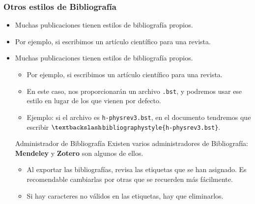 \documentclass[aspectratio=1610]{beamer}%
\begin{document}
\begin{frame}[fragile]
\frametitle{\textbf{Otros estilos de Bibliografía}}
\justifying
 \begin{itemize}\justifying
  \item Muchas publicaciones tienen estilos de bibliografía propios.
  \item Por ejemplo, si escribimos un artículo científico para una revista.
  \item Muchas publicaciones tienen estilos de bibliografía propios.
  \begin{itemize}\justifying
  \item Por ejemplo, si escribimos un artículo científico para una revista.
  \item En este caso, nos proporcionarán un archivo \texttt{.bst}, y podremos usar ese estilo en lugar de los que vienen por defecto.
  \item [] Ejemplo: si el archivo es \texttt{h-physrev3.bst}, en el documento tendremos que escribir \texttt{$\textbackslash$bibliographystyle\{h-physrev3.bst\}}.
\end{itemize}
\begin{block}{Administrador de Bibliografía}
Existen varios administradores de Bibliografía: \textbf{Mendeley} y \textbf{Zotero} son algunos de ellos.
\begin{itemize}\justifying
  \item Al exportar las bibliografías, revisa las etiquetas que se han asignado. Es recomendable cambiarlas por otras que se recuerden más fácilmente.
  \item Si hay caracteres no válidos en las etiquetas, hay que eliminarlos.
\end{itemize}
\end{block}
\end{itemize}
\end{frame}
\end{document}
